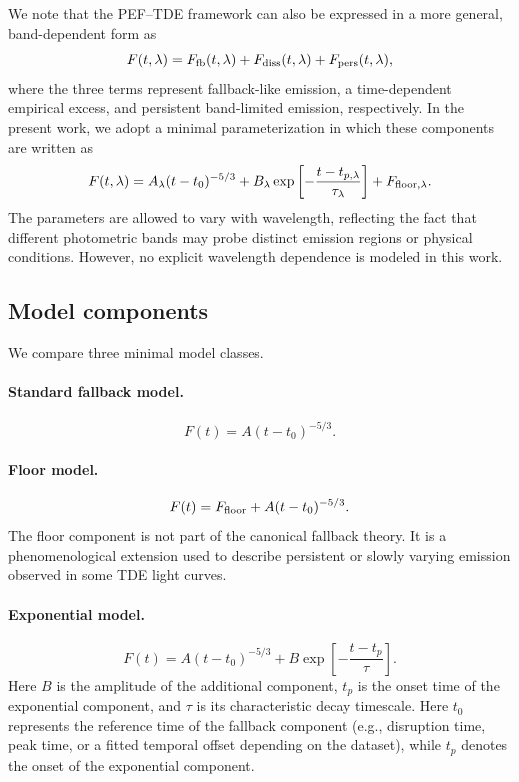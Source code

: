 \documentclass[11pt]{article}
\begin{document}
We note that the PEF--TDE framework can also be expressed in a more general, band-dependent form as
\begin{equation}
F(t,\lambda)=F_{\rm fb}(t,\lambda)+F_{\rm diss}(t,\lambda)+F_{\rm pers}(t,\lambda),
\label{eq:general_decomposition}
\end{equation}
where the three terms represent fallback-like emission, a time-dependent empirical excess, and persistent band-limited emission, respectively. In the present work, we adopt a minimal parameterization in which these components are written as
\begin{equation}
F(t,\lambda)=A_\lambda (t-t_0)^{-5/3}
+B_\lambda \exp\left[-\frac{t-t_{p,\lambda}}{\tau_\lambda}\right]
+F_{{\rm floor},\lambda}.
\label{eq:band_dependent_model}
\end{equation}
The parameters are allowed to vary with wavelength, reflecting the fact that different photometric bands may probe distinct emission regions or physical conditions. However, no explicit wavelength dependence is modeled in this work.


\subsection{Model components}
We compare three minimal model classes.

\paragraph{Standard fallback model.}
\begin{equation}
F(t)=A(t-t_0)^{-5/3}.
\label{eq:standard}
\end{equation}

\paragraph{Floor model.}
\begin{equation}
F(t)=F_{\rm floor}+A(t-t_0)^{-5/3}.
\label{eq:floor}
\end{equation}
The floor component is not part of the canonical fallback theory. It is a phenomenological extension used to describe persistent or slowly varying emission observed in some TDE light curves.

\paragraph{Exponential model.}
\begin{equation}
F(t)=A(t-t_0)^{-5/3}+B\exp\left[-\frac{t-t_p}{\tau}\right].
\label{eq:expmodel}
\end{equation}
Here $B$ is the amplitude of the additional component, $t_p$ is the onset time of the exponential component, and $\tau$ is its characteristic decay timescale. Here $t_0$ represents the reference time of the fallback component (e.g., disruption time, peak time, or a fitted temporal offset depending on the dataset), while $t_p$ denotes the onset of the exponential component.
\end{document}
